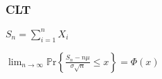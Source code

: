 \documentclass[9pt,landscape]{article}
\begin{document}
\begin{multicols}{3}
\subsubsection{CLT}

$S_n=\sum_{i=1}^{n}X_i$

$\lim_{n\to\infty}\mathbb{P}\mathrm{r}\left\{\frac{S_n-n\mu}{\sigma\sqrt{n}}\le x\right\}=\Phi(x)$


%
%
%
%
%
%

\end{multicols}
\end{document}
